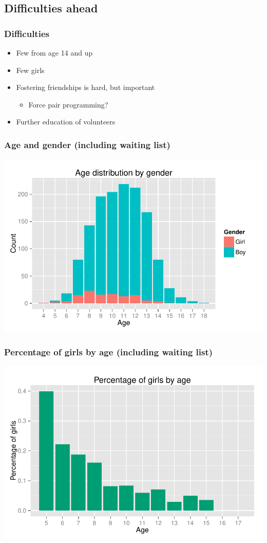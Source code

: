 \documentclass{beamer}
\begin{document}


\subsection{Difficulties ahead}
\begin{frame}
\frametitle{Difficulties}
\begin{itemize}
\item Few from age 14 and up
\item Few girls
\item Fostering friendships is hard, but important
  \begin{itemize}
  \item Force pair programming?
  \end{itemize}
\item Further education of volunteers
\end{itemize}
\end{frame}

\begin{frame}
  \frametitle{Age and gender (including waiting list)}
  \centerline{\includegraphics[width=\textwidth]{../datacrunching/age-gender-hist}}
\end{frame}

\begin{frame}
  \frametitle{Percentage of girls by age (including waiting list)}
  \centerline{\includegraphics[width=\textwidth]{../datacrunching/girl_percentage}}
\end{frame}
\end{document}
